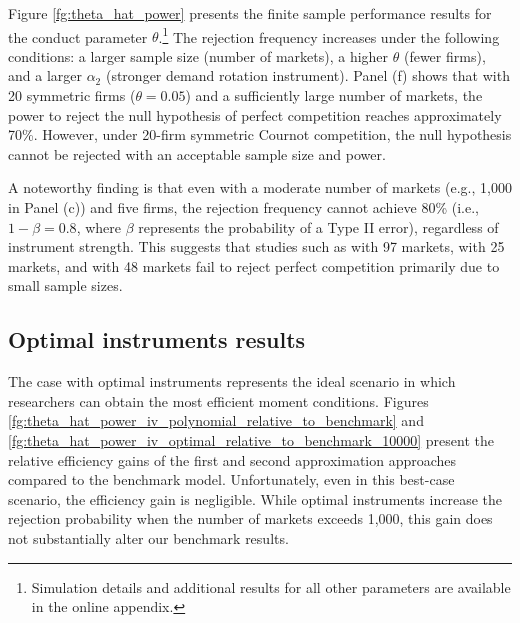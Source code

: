 \documentclass[11pt, a4paper]{article}
\begin{document}
Figure \ref{fg:theta_hat_power} presents the finite sample performance results for the conduct parameter $\theta$.\footnote{Simulation details and additional results for all other parameters are available in the online appendix.} The rejection frequency increases under the following conditions: a larger sample size (number of markets), a higher $\theta$ (fewer firms), and a larger $\alpha_2$ (stronger demand rotation instrument). Panel (f) shows that with 20 symmetric firms ($\theta=0.05$) and a sufficiently large number of markets, the power to reject the null hypothesis of perfect competition reaches approximately 70\%. However, under 20-firm symmetric Cournot competition, the null hypothesis cannot be rejected with an acceptable sample size and power.

A noteworthy finding is that even with a moderate number of markets (e.g., 1,000 in Panel (c)) and five firms, the rejection frequency cannot achieve 80\% (i.e., $1-\beta=0.8$, where $\beta$ represents the probability of a Type II error), regardless of instrument strength. This suggests that studies such as \cite{genesove1998testing} with 97 markets, \cite{shaffer1993test} with 25 markets, and \cite{steen1999testing} with 48 markets fail to reject perfect competition primarily due to small sample sizes.

\subsection{Optimal instruments results}
The case with optimal instruments represents the ideal scenario in which researchers can obtain the most efficient moment conditions. Figures \ref{fg:theta_hat_power_iv_polynomial_relative_to_benchmark} and \ref{fg:theta_hat_power_iv_optimal_relative_to_benchmark_10000} present the relative efficiency gains of the first and second approximation approaches compared to the benchmark model. Unfortunately, even in this best-case scenario, the efficiency gain is negligible. While optimal instruments increase the rejection probability when the number of markets exceeds 1,000, this gain does not substantially alter our benchmark results.
\end{document}
